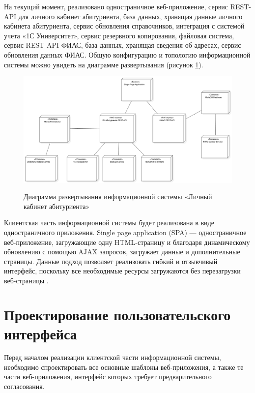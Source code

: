 На текущий момент, реализовано одностраничное веб-приложение, сервис REST-API для личного кабинет абитуриента, база данных, хранящая данные личного кабинета абитуриента, сервис обновления справочников, интеграция с системой учета «1С Университет», сервис резервного копирования, файловая система, сервис REST-API ФИАС, база данных, хранящая сведения об адресах, сервис обновления данных ФИАС. Общую конфигурацию и топологию информационной системы можно увидеть на диаграмме развертывания (рисунок \ref{fig:diagramdeploy}).

\begin{figure}[H]
\begin{center}
\includegraphics[width=1\hsize]{fig/diagram-deploy.png}\\[2mm]
\caption{Диаграмма развертывания информационной системы «Личный кабинет абитуриента»}\label{fig:diagramdeploy}
\end{center}
\end{figure}

Клиентская часть информационной системы будет реализована в виде одностраничного приложения. Single page application (SPA) — одностраничное веб-приложение, загружающие одну HTML-страницу и благодаря динамическому обновлению с помощью AJAX запросов, загружает данные и дополнительные страницы. Данные подход позволяет реализовать гибкий и отзывчивый интерфейс, поскольку все необходимые ресурсы загружаются без перезагрузки веб-страницы \cite{spa}.

\section{Проектирование пользовательского интерфейса}

Перед началом реализации клиентской части информационной системы, необходимо спроектировать все основные шаблоны веб-приложения, а также те части веб-приложения, интерфейс которых требует предварительного согласования.

